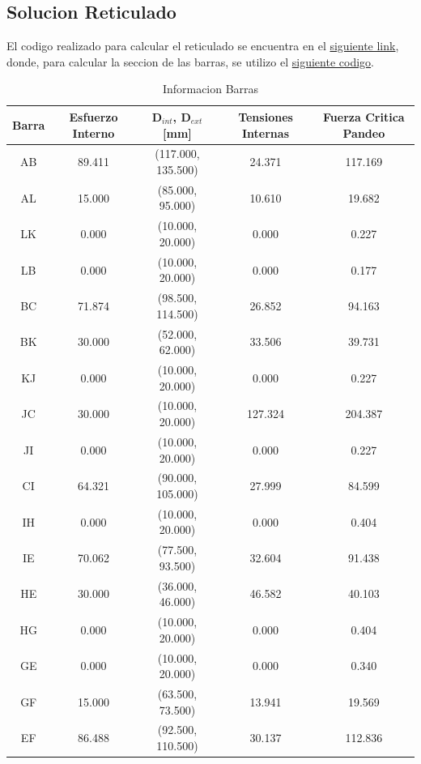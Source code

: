 \subsection{Solucion Reticulado}

El codigo realizado para calcular el reticulado se encuentra en el \href{https://github.com/LukasWolff2002/PROYECTO_3_MCOC/blob/main/CODIGO/CODIGO_MANUAL/solucion_reticulado.py}{siguiente link}, donde, para calcular la seccion de las barras, se utilizo el \href{https://github.com/LukasWolff2002/PROYECTO_3_MCOC/blob/main/CODIGO/CODIGO_MANUAL/tipo_barras.py}{siguiente codigo}.

\begin{table}[H]
    \centering
    \begin{tabular}{|c|c|c|c|c|}
    \hline
    \textbf{Barra} & \textbf{Esfuerzo Interno} & \textbf{D$_{int}$, D$_{ext}$ [mm]} & \textbf{Tensiones Internas} & \textbf{Fuerza Critica Pandeo} \\ 
    \hline
    AB & 89.411 & (117.000, 135.500) & 24.371 & 117.169 \\ 
    AL & 15.000 & (85.000, 95.000) & 10.610 & 19.682 \\ 
    LK & 0.000 & (10.000, 20.000) & 0.000 & 0.227 \\ 
    LB & 0.000 & (10.000, 20.000) & 0.000 & 0.177 \\ 
    BC & 71.874 & (98.500, 114.500) & 26.852 & 94.163 \\ 
    BK & 30.000 & (52.000, 62.000) & 33.506 & 39.731 \\ 
    KJ & 0.000 & (10.000, 20.000) & 0.000 & 0.227 \\ 
    JC & 30.000 & (10.000, 20.000) & 127.324 & 204.387 \\ 
    JI & 0.000 & (10.000, 20.000) & 0.000 & 0.227 \\ 
    CI & 64.321 & (90.000, 105.000) & 27.999 & 84.599 \\ 
    IH & 0.000 & (10.000, 20.000) & 0.000 & 0.404 \\ 
    IE & 70.062 & (77.500, 93.500) & 32.604 & 91.438 \\ 
    HE & 30.000 & (36.000, 46.000) & 46.582 & 40.103 \\ 
    HG & 0.000 & (10.000, 20.000) & 0.000 & 0.404 \\ 
    GE & 0.000 & (10.000, 20.000) & 0.000 & 0.340 \\ 
    GF & 15.000 & (63.500, 73.500) & 13.941 & 19.569 \\ 
    EF & 86.488 & (92.500, 110.500) & 30.137 & 112.836 \\ 
    \hline
    \end{tabular}
    \caption{Informacion Barras}
\end{table}

